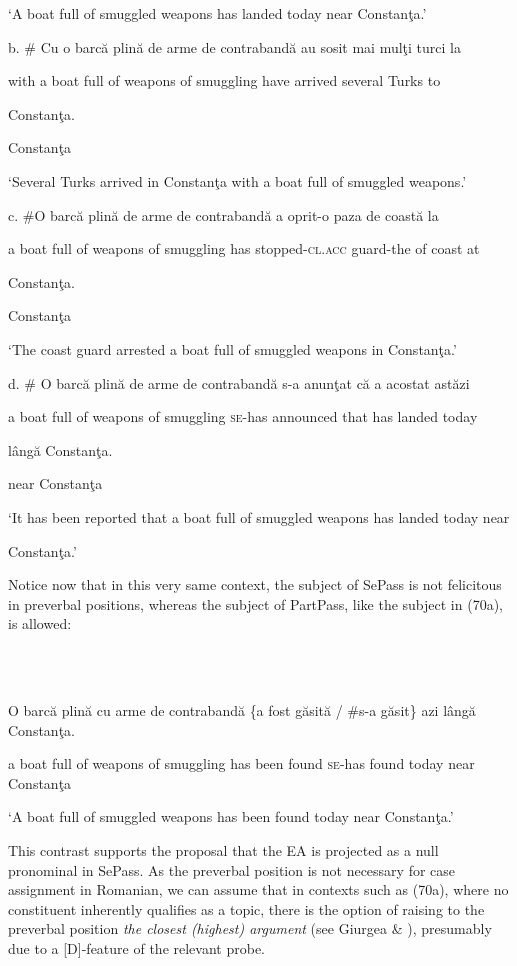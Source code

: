 \documentclass[output=paper]{langsci/langscibook}
\begin{document}
              ‘A boat full of smuggled weapons has landed today near Constanţa.’

b.    \#  Cu   o  barcă plină de  arme        de contrabandă au     sosit      mai mulţi turci  la 

         with a  boat  full   of   weapons of smuggling    have arrived  several     Turks  to

         Constanţa.

         Constanţa

         ‘Several Turks arrived in Constanţa with a boat full of smuggled weapons.’

c.      \#O barcă plină de arme de contrabandă a oprit-o           paza        de  coastă la 

         a boat  full  of weapons of smuggling has stopped-\textsc{cl.acc} guard-the of  coast   at

         Constanţa.

         Constanţa

         ‘The coast guard arrested a boat full of smuggled weapons in Constanţa.’

d.    \# O barcă plină de arme   de contrabandă s-a      anunţat        că   a    acostat  astăzi

         a boat   full   of  weapons of smuggling \textsc{se-}has announced that has  landed  today  

         lângă Constanţa. 

         near   Constanţa 

        ‘It has been reported that a boat full of smuggled weapons has landed today near

        Constanţa.’

Notice now that in this very same context, the subject of SePass is not felicitous in preverbal positions, whereas the subject of PartPass, like the subject in (70a), is allowed:

\ea%
    \label{ex:key:71}
    \gll\\
        \\
    \glt
    \z

          O barcă plină cu arme   de contrabandă \{a  fost găsită  / \#s-a    găsit\} azi    lângă Constanţa.

a boat   full   of weapons of smuggling  has been found \textsc{se-}has found today near  Constanţa

           ‘A boat full of smuggled weapons has been found today near Constanţa.’

This contrast supports the proposal that the EA is projected as a null pronominal in SePass. As the preverbal position is not necessary for case assignment in Romanian, we can assume that in contexts such as (70a), where no constituent inherently qualifies as a topic, there is the option of raising to the preverbal position \textit{the closest (highest) argument} (see Giurgea \& \citealt{Remberger2012}), presumably due to a [D]-feature of the relevant probe.  
\end{document}
